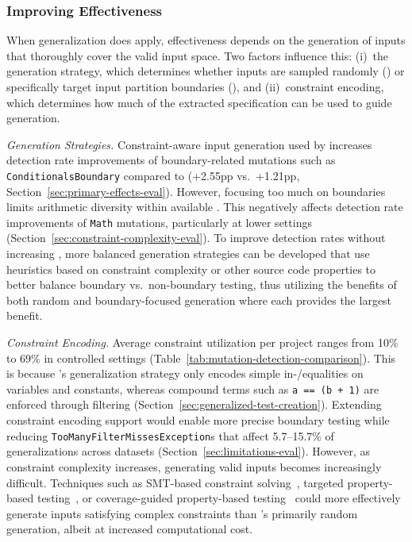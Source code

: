 \subsubsection{Improving Effectiveness}

When generalization does apply, effectiveness depends on
the generation of inputs that thoroughly cover the valid input space.
Two factors influence this:
(i)~the generation strategy,
which determines whether inputs are sampled randomly (\VariantNaive{})
or specifically target input partition boundaries (\VariantImproved{}),
and (ii)~constraint encoding,
which determines how much of the extracted specification can be used to guide generation.

\textit{Generation Strategies.}
Constraint-aware input generation used by \VariantImproved{}
increases detection rate improvements of boundary-related mutations
such as \texttt{ConditionalsBoundary} compared to \VariantNaive{} (+2.55pp vs.\ +1.21pp,
Section~\ref{sec:primary-effects-eval}).
However, focusing too much on boundaries limits arithmetic diversity
within available \tries{}.
This negatively affects detection rate improvements of \texttt{Math} mutations,
particularly at lower \tries{} settings (Section~\ref{sec:constraint-complexity-eval}).
To improve detection rates without increasing \tries{},
more balanced generation strategies can be developed
that use heuristics based on constraint complexity or other source code properties
to better balance boundary vs.\ non-boundary testing,
thus utilizing the benefits of both random and boundary-focused
generation where each provides the largest benefit.

\textit{Constraint Encoding.}
Average constraint utilization per project ranges from 10\% to 69\%
in controlled settings
(Table~\ref{tab:mutation-detection-comparison}).
This is because \ToolTeralizer{}'s \VariantImproved{} generalization strategy
only encodes simple in-/equalities on variables and constants,
whereas compound terms such as \texttt{a == (b + 1)}
are enforced through filtering (Section~\ref{sec:generalized-test-creation}).
Extending constraint encoding support would enable more precise boundary testing
while reducing \texttt{TooManyFilterMissesException}s
that affect 5.7--15.7\% of generalizations across datasets
(Section~\ref{sec:limitations-eval}).
However, as constraint complexity increases,
generating valid inputs becomes increasingly difficult.
Techniques such as SMT-based constraint solving~\cite{de_moura_2008_z3,ringer_2017_iorek},
targeted property-based testing~\cite{loscher_2017_targeted},
or coverage-guided property-based testing~\cite{lampropoulos_2019_fuzzchick}
could more effectively generate inputs satisfying complex constraints
than \ToolJqwik{}'s primarily random generation,
albeit at increased computational cost.

